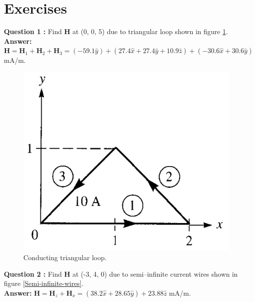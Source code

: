 \documentclass[12pt,a4paper]{article}
\begin{document}
\section{Exercises}
\noindent\textbf{Question 1 \cite[PE 7.1, page 266]{Sadiku}:} Find \textbf{H} at (0, 0, 5) due to triangular loop shown in figure \ref{Conducting-triangular-loop}.\\
\textbf{Answer: }$\textbf{H}=\textbf{H}_1+\textbf{H}_2+\textbf{H}_3=(-59.1\hat y)+(27.4\hat x+27.4\hat y+10.9\hat z)+(-30.6\hat x+30.6\hat y)$ mA/m.
\begin{figure}[H]
\centering
\includegraphics[scale=0.45]{Figure7-6aS.png}
\caption{Conducting triangular loop.}
\label{Conducting-triangular-loop}
\end{figure}
\noindent\textbf{Question 2 \cite[Example 7.1, page 266]{Sadiku}:} Find \textbf{H} at (-3, 4, 0) due to semi--infinite current wires shown in figure \ref{Semi-infinite-wires}.\\
\textbf{Answer: }$\textbf{H}=\textbf{H}_z+\textbf{H}_x=(38.2\hat x+28.65\hat y)+23.88\hat z$ mA/m.
\end{document}
